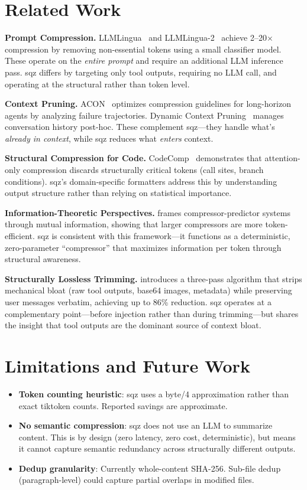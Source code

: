 \documentclass[10pt,twocolumn]{article}
\begin{document}
\section{Related Work}

\textbf{Prompt Compression.} LLMLingua~\cite{jiang2023llmlingua} and LLMLingua-2~\cite{pan2024llmlingua2} achieve 2--20$\times$ compression by removing non-essential tokens using a small classifier model. These operate on the \emph{entire prompt} and require an additional LLM inference pass. sqz differs by targeting only tool outputs, requiring no LLM call, and operating at the structural rather than token level.

\textbf{Context Pruning.} ACON~\cite{acon2024} optimizes compression guidelines for long-horizon agents by analyzing failure trajectories. Dynamic Context Pruning~\cite{anagnostidis2023dynamic} manages conversation history post-hoc. These complement sqz---they handle what's \emph{already in context}, while sqz reduces what \emph{enters} context.

\textbf{Structural Compression for Code.} CodeComp~\cite{chen2025codecomp} demonstrates that attention-only compression discards structurally critical tokens (call sites, branch conditions). sqz's domain-specific formatters address this by understanding output structure rather than relying on statistical importance.

\textbf{Information-Theoretic Perspectives.} \cite{infotheory2024} frames compressor-predictor systems through mutual information, showing that larger compressors are more token-efficient. sqz is consistent with this framework---it functions as a deterministic, zero-parameter ``compressor'' that maximizes information per token through structural awareness.

\textbf{Structurally Lossless Trimming.} \cite{dag2025} introduces a three-pass algorithm that strips mechanical bloat (raw tool outputs, base64 images, metadata) while preserving user messages verbatim, achieving up to 86\% reduction. sqz operates at a complementary point---before injection rather than during trimming---but shares the insight that tool outputs are the dominant source of context bloat.

\section{Limitations and Future Work}

\begin{itemize}
  \item \textbf{Token counting heuristic}: sqz uses a byte/4 approximation rather than exact tiktoken counts. Reported savings are approximate.
  \item \textbf{No semantic compression}: sqz does not use an LLM to summarize content. This is by design (zero latency, zero cost, deterministic), but means it cannot capture semantic redundancy across structurally different outputs.
  \item \textbf{Dedup granularity}: Currently whole-content SHA-256. Sub-file dedup (paragraph-level) could capture partial overlaps in modified files.
\end{itemize}
\end{document}
